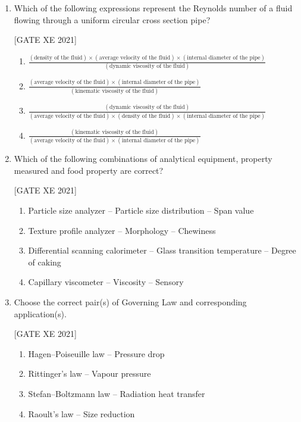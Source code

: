 \documentclass[journal,12pt,onecolumn]{IEEEtran}
\theoremstyle{remark}
\begin{document}
\begin{enumerate}[resume]
\item Which of the following expressions represent the Reynolds number of a fluid flowing through a uniform circular cross section pipe?

\hfill[GATE XE 2021]

\begin{enumerate}
    \item $\frac{(\text{density of the fluid}) \times (\text{average velocity of the fluid}) \times (\text{internal diameter of the pipe})}{(\text{dynamic viscosity of the fluid})}$
    \item $\frac{(\text{average velocity of the fluid}) \times (\text{internal diameter of the pipe})}{(\text{kinematic viscosity of the fluid})}$
    \item $\frac{(\text{dynamic viscosity of the fluid})}{(\text{average velocity of the fluid}) \times (\text{density of the fluid}) \times (\text{internal diameter of the pipe})}$
    \item $\frac{(\text{kinematic viscosity of the fluid})}{(\text{average velocity of the fluid}) \times (\text{internal diameter of the pipe})}$
\end{enumerate}



\item Which of the following combinations of analytical equipment, property measured and food property are correct?

\hfill[GATE XE 2021]

\begin{multicols}{2}
\begin{enumerate}
\item Particle size analyzer – Particle size distribution – Span value
\item Texture profile analyzer – Morphology – Chewiness
\item Differential scanning calorimeter – Glass transition temperature – Degree of caking
\item Capillary viscometer – Viscosity – Sensory
\end{enumerate}
\end{multicols}


\item Choose the correct pair(s) of Governing Law and corresponding application(s).

\hfill[GATE XE 2021]

\begin{multicols}{2}
\begin{enumerate}
\item Hagen–Poiseuille law – Pressure drop
\item Rittinger’s law – Vapour pressure
\item Stefan–Boltzmann law – Radiation heat transfer
\item Raoult’s law – Size reduction
\end{enumerate}
\end{multicols}



\end{enumerate}
\end{document}
